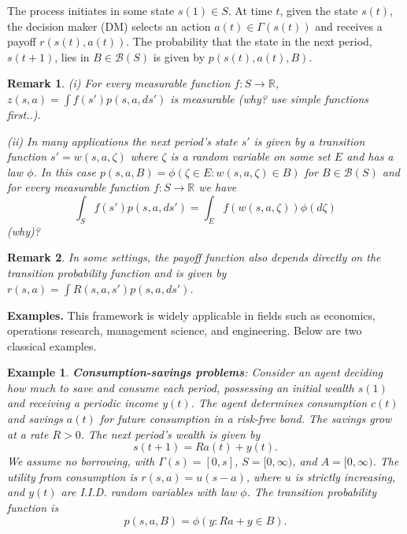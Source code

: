\documentclass[letter,11pt]{article}
\newtheorem{example}{Example}[section]
\newtheorem{remark}{Remark}[section]
\begin{document}
The process initiates in some state \(s(1) \in S\). At time \(t\), given the state \(s(t)\), the decision maker (DM) selects an action \(a(t) \in \Gamma(s(t))\) and receives a payoff \(r(s(t), a(t))\). The probability that the state in the next period, \(s(t+1)\), lies in \(B \in \mathcal{B}(S)\) is given by \(p(s(t), a(t), B)\).

\begin{remark}
   (i) For every  measurable function $f:S \rightarrow \mathbb{R}$, $z(s,a) = \int f(s')p(s,a,ds')$ is measurable (why? use simple functions first..). 

(ii) In many applications the next period's state $s'$ is given by a transition function $s' =w(s,a,\zeta)$ where $\zeta$ is a random variable on some set $E$ and has a law $ \phi $. In this case $p(s,a,B) = \phi (\zeta \in E: w(s,a,\zeta) \in B)  $ for  \(B \in \mathcal{B}(S)\) and for every measurable function $f:S \rightarrow \mathbb{R}$ we have 
$$  \int _{S} f(s')p(s,a,ds') =  \int _{E }f (w(s,a,\zeta)) \phi (d \zeta ) $$
  (why)? 
\end{remark}

\begin{remark} \label{remark:directly}
    In some settings, the payoff function also depends directly on the transition probability function and is given by $r(s,a) = \int R(s,a,s') p(s,a,ds')$. 
\end{remark}

\textbf{Examples.} This framework is widely applicable in fields such as economics, operations research, management science, and engineering. Below are two classical examples.

\begin{example}
\textbf{Consumption-savings problems}: Consider an agent deciding how much to save and consume each period, possessing an initial wealth \(s(1)\) and receiving a periodic income \(y(t)\). The agent determines consumption \(c(t)\) and savings \(a(t)\) for future consumption in a risk-free bond. The savings grow at a rate \(R > 0\). The next period's wealth is given by
\[
s(t+1) = R a(t) + y(t).
\]
We assume no borrowing, with \(\Gamma(s) = [0, s]\), \(S = [0, \infty)\), and \(A = [0, \infty)\). The utility from consumption is \(r(s, a) = u(s-a)\), where \(u\) is strictly increasing, and \(y(t)\) are I.I.D. random variables with law \(\phi\). The transition probability function is
\[
p(s, a, B) = \phi(y : Ra + y \in B).
\]
\end{example}
\end{document}
